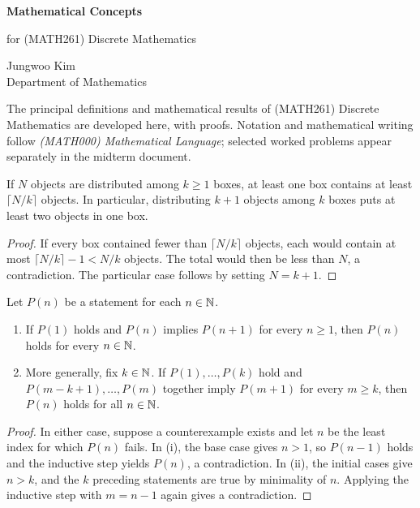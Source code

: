 \documentclass[11pt, oneside]{article}
\begin{document}
\thispagestyle{empty}
\begin{center}
    \vspace*{1.1cm}
    {\LARGE\bfseries Mathematical Concepts\par}
    \vspace{0.25cm}
    {\large for (MATH261) Discrete Mathematics\par}
    \vspace{0.75cm}
    {\normalsize Jungwoo Kim\\
    Department of Mathematics\\
    \PohangUniversityOfScienceAndTechnology\par}
\end{center}
\vspace{0.45cm}
The principal definitions and mathematical results of (MATH261) Discrete Mathematics are developed here, with proofs. Notation and mathematical writing follow \textit{(MATH000) Mathematical Language}; selected worked problems appear separately in the midterm document.

\begin{theorem}\label{thm:pigeonhole}
If $N$ objects are distributed among $k\ge1$ boxes, at least one box contains at least $\lceil N/k\rceil$ objects. In particular, distributing $k+1$ objects among $k$ boxes puts at least two objects in one box.
\end{theorem}
\begin{proof}
If every box contained fewer than $\lceil N/k\rceil$ objects, each would contain at most $\lceil N/k\rceil-1<N/k$ objects. The total would then be less than $N$, a contradiction. The particular case follows by setting $N=k+1$.
\end{proof}

\begin{theorem}
Let $P(n)$ be a statement for each $n\in\mathbb{N}$.
\begin{enumerate}[label=(\roman*)]
\item If $P(1)$ holds and $P(n)$ implies $P(n+1)$ for every $n\ge1$, then $P(n)$ holds for every $n\in\mathbb{N}$.
\item More generally, fix $k\in\mathbb{N}$. If $P(1), \ldots, P(k)$ hold and $P(m-k+1), \ldots, P(m)$ together imply $P(m+1)$ for every $m\ge k$, then $P(n)$ holds for all $n\in\mathbb{N}$.
\end{enumerate}
\end{theorem}
\begin{proof}
In either case, suppose a counterexample exists and let $n$ be the least index for which $P(n)$ fails. In (i), the base case gives $n>1$, so $P(n-1)$ holds and the inductive step yields $P(n)$, a contradiction. In (ii), the initial cases give $n>k$, and the $k$ preceding statements are true by minimality of $n$. Applying the inductive step with $m=n-1$ again gives a contradiction.
\end{proof}
\end{document}
